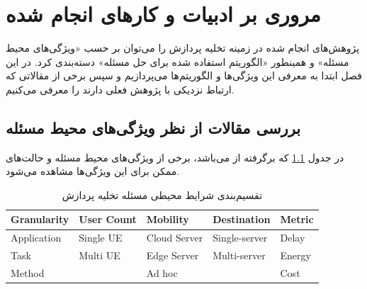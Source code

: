 \chapter{مروری بر ادبیات و کارهای انجام شده}
پژوهش‌های انجام شده در زمینه تخلیه پردازش را می‌توان بر حسب «ویژگی‌های محیط مسئله» و همینطور «الگوریتم استفاده شده برای حل مسئله» دسته‌بندی کرد. در این فصل ابتدا به معرفی این ویژگی‌ها و الگوریتم‌ها می‌پردازیم و سپس برخی از مقالاتی که ارتباط نزدیکی با پژوهش فعلی دارند را معرفی می‌کنیم.

\section[ویژگی‌های محیط مسئله]{بررسی مقالات از نظر ویژگی‌های محیط مسئله} 
در جدول \ref{table:mohit} که برگرفته از \cite{wang2019} می‌باشد، برخی از ویژگی‌های محیط مسئله و حالت‌های ممکن برای این ویژگی‌ها مشاهده می‌شود.
\begin{table}[H]
	\centering
	\begin{latin}

\begin{tabular}{@{}lllll@{}}
	\toprule
	\textbf{Granularity} & \textbf{User Count} & \textbf{Mobility} & \textbf{Destination} & \textbf{Metric} \\ \midrule
	Application          & Single UE             & Cloud Server      & Single-server        & Delay           \\
	Task                 & Multi UE   & Edge Server       & Multi-server         & Energy          \\
	Method               &             & Ad hoc            &                      & Cost            \\ \bottomrule
\end{tabular}
	\end{latin}
	\caption{تقسیم‌بندی شرایط محیطی مسئله تخلیه پردازش}
	\label{table:mohit}
\end{table}


